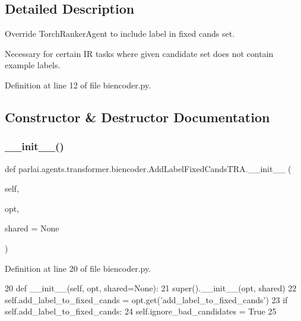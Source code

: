 \subsection{Detailed Description}
\begin{DoxyVerb}Override TorchRankerAgent to include label in fixed cands set.

Necessary for certain IR tasks where given candidate set does not contain example
labels.
\end{DoxyVerb}
 

Definition at line 12 of file biencoder.\+py.



\subsection{Constructor \& Destructor Documentation}
\mbox{\label{classparlai_1_1agents_1_1transformer_1_1biencoder_1_1AddLabelFixedCandsTRA_a591f1ad203927b07db58520a7295132c}} 
\subsubsection{\texorpdfstring{\+\_\+\+\_\+init\+\_\+\+\_\+()}{\_\_init\_\_()}}
{\footnotesize\ttfamily def parlai.\+agents.\+transformer.\+biencoder.\+Add\+Label\+Fixed\+Cands\+T\+R\+A.\+\_\+\+\_\+init\+\_\+\+\_\+ (\begin{DoxyParamCaption}\item[{}]{self,  }\item[{}]{opt,  }\item[{}]{shared = {\ttfamily None} }\end{DoxyParamCaption})}



Definition at line 20 of file biencoder.\+py.


\begin{DoxyCode}
20     \textcolor{keyword}{def }\_\_init\_\_(self, opt, shared=None):
21         super().\_\_init\_\_(opt, shared)
22         self.add\_label\_to\_fixed\_cands = opt.get(\textcolor{stringliteral}{'add\_label\_to\_fixed\_cands'})
23         \textcolor{keywordflow}{if} self.add\_label\_to\_fixed\_cands:
24             self.ignore\_bad\_candidates = \textcolor{keyword}{True}
25 
\end{DoxyCode}


